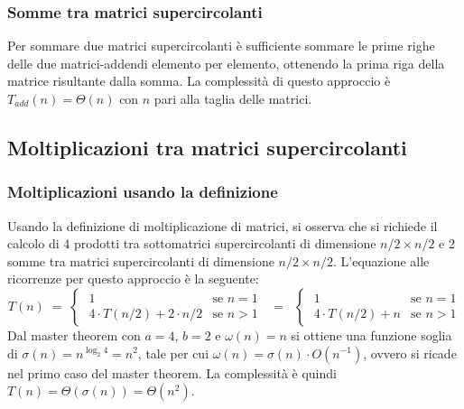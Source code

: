 \subsubsection*{Somme tra matrici supercircolanti}
Per sommare due matrici supercircolanti è sufficiente sommare le prime righe delle due matrici-addendi elemento per elemento, ottenendo
la prima riga della matrice risultante dalla somma. La complessità di questo approccio è \(T_{add}(n) = \Theta(n)\) con \(n\)
pari alla taglia delle matrici.

\subsection{Moltiplicazioni tra matrici supercircolanti}
\subsubsection*{Moltiplicazioni usando la definizione}
Usando la definizione di moltiplicazione di matrici, si osserva che si richiede il calcolo di 4 prodotti tra sottomatrici
supercircolanti di dimensione \(n/2 \times n/2\) e 2 somme tra matrici supercircolanti di dimensione \(n/2 \times n/2\).
L'equazione alle ricorrenze per questo approccio è la seguente:
\[T(n) \; = \; \begin{cases}
	\; 1 & \text{se } n = 1 \\[3pt]
	\; 4 \cdot T(n/2) + 2 \cdot n/2 & \text{se } n > 1
\end{cases} \;\; = \;\; \begin{cases}
	\; 1 & \text{se } n = 1 \\[3pt]
	\; 4 \cdot T(n/2) + n & \text{se } n > 1
\end{cases}\]
Dal master theorem con \(a = 4\), \(b = 2\) e \(\omega(n) = n\) si ottiene una funzione soglia di
\(\sigma(n) = n^{\log_2 4} = n^2\), tale per cui \(\omega(n) = \sigma(n) \cdot O(n^{-1})\), ovvero si ricade
nel primo caso del master theorem. La complessità è quindi \(T(n) = \Theta(\sigma(n)) = \Theta(n^2)\).

\newpage

